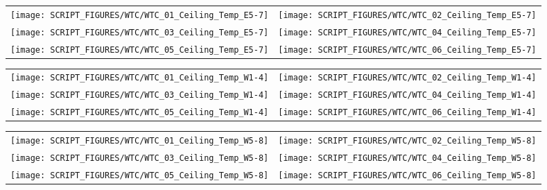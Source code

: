 \begin{figure}[!ht]
\begin{tabular*}{\textwidth}{l@{\extracolsep{\fill}}r}
\texttt{[image: SCRIPT\_FIGURES/WTC/WTC\_01\_Ceiling\_Temp\_E5-7]} &
\texttt{[image: SCRIPT\_FIGURES/WTC/WTC\_02\_Ceiling\_Temp\_E5-7]} \\
\texttt{[image: SCRIPT\_FIGURES/WTC/WTC\_03\_Ceiling\_Temp\_E5-7]} &
\texttt{[image: SCRIPT\_FIGURES/WTC/WTC\_04\_Ceiling\_Temp\_E5-7]} \\
\texttt{[image: SCRIPT\_FIGURES/WTC/WTC\_05\_Ceiling\_Temp\_E5-7]} &
\texttt{[image: SCRIPT\_FIGURES/WTC/WTC\_06\_Ceiling\_Temp\_E5-7]}
\end{tabular*}
\label{NIST_WTC_Ceiling_E5-7}
\end{figure}

\begin{figure}[!ht]
\begin{tabular*}{\textwidth}{l@{\extracolsep{\fill}}r}
\texttt{[image: SCRIPT\_FIGURES/WTC/WTC\_01\_Ceiling\_Temp\_W1-4]} &
\texttt{[image: SCRIPT\_FIGURES/WTC/WTC\_02\_Ceiling\_Temp\_W1-4]} \\
\texttt{[image: SCRIPT\_FIGURES/WTC/WTC\_03\_Ceiling\_Temp\_W1-4]} &
\texttt{[image: SCRIPT\_FIGURES/WTC/WTC\_04\_Ceiling\_Temp\_W1-4]} \\
\texttt{[image: SCRIPT\_FIGURES/WTC/WTC\_05\_Ceiling\_Temp\_W1-4]} &
\texttt{[image: SCRIPT\_FIGURES/WTC/WTC\_06\_Ceiling\_Temp\_W1-4]}
\end{tabular*}
\label{NIST_WTC_Ceiling_W1-4}
\end{figure}

\begin{figure}[!ht]
\begin{tabular*}{\textwidth}{l@{\extracolsep{\fill}}r}
\texttt{[image: SCRIPT\_FIGURES/WTC/WTC\_01\_Ceiling\_Temp\_W5-8]} &
\texttt{[image: SCRIPT\_FIGURES/WTC/WTC\_02\_Ceiling\_Temp\_W5-8]} \\
\texttt{[image: SCRIPT\_FIGURES/WTC/WTC\_03\_Ceiling\_Temp\_W5-8]} &
\texttt{[image: SCRIPT\_FIGURES/WTC/WTC\_04\_Ceiling\_Temp\_W5-8]} \\
\texttt{[image: SCRIPT\_FIGURES/WTC/WTC\_05\_Ceiling\_Temp\_W5-8]} &
\texttt{[image: SCRIPT\_FIGURES/WTC/WTC\_06\_Ceiling\_Temp\_W5-8]}
\end{tabular*}
\label{NIST_WTC_Ceiling_W5-8}
\end{figure}

